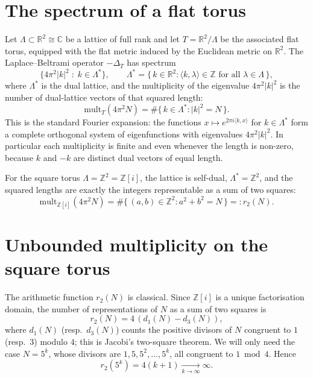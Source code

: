 \documentclass[11pt]{article}
\theoremstyle{definition}
\theoremstyle{remark}
\newcommand{\R}{\mathbb{R}}
\newcommand{\Z}{\mathbb{Z}}
\newcommand{\C}{\mathbb{C}}
\newcommand{\Lam}{\Lambda}
\newcommand{\rtwo}{r_2}
\begin{document}
\section{The spectrum of a flat torus}
\label{sec:spectral}

Let $\Lam\subset\R^2\cong\C$ be a lattice of full rank and let
$T=\R^2/\Lam$ be the associated flat torus, equipped with the flat metric
induced by the Euclidean metric on $\R^2$.  The Laplace--Beltrami operator
$-\Delta_T$ has spectrum
\begin{equation}
\label{eq:spectrum}
\{4\pi^2|k|^2 \;:\; k\in\Lam^{*}\},
\qquad
\Lam^{*}=\{\,k\in\R^2 : \langle k,\lambda\rangle\in\Z
\text{ for all }\lambda\in\Lam\,\},
\end{equation}
where $\Lam^{*}$ is the dual lattice, and the multiplicity of the eigenvalue
$4\pi^2|k|^2$ is the number of dual-lattice vectors of that squared length:
\begin{equation}
\label{eq:mult}
\mathrm{mult}_T(4\pi^2 N)=\#\{\,k\in\Lam^{*} : |k|^2=N\,\}.
\end{equation}
This is the standard Fourier expansion: the functions
$x\mapsto e^{2\pi i\langle k,x\rangle}$ for $k\in\Lam^{*}$ form a complete
orthogonal system of eigenfunctions with eigenvalues $4\pi^2|k|^2$.  In
particular each multiplicity is finite and even whenever the length is
non-zero, because $k$ and $-k$ are distinct dual vectors of equal length.

For the square torus $\Lam=\Z^2=\Z[i]$, the lattice is self-dual,
$\Lam^{*}=\Z^2$, and the squared lengths are exactly the integers representable
as a sum of two squares:
\begin{equation}
\label{eq:square-mult}
\mathrm{mult}_{\Z[i]}(4\pi^2 N)
=\#\{\,(a,b)\in\Z^2 : a^2+b^2=N\,\}
=:\rtwo(N).
\end{equation}

\section{Unbounded multiplicity on the square torus}
\label{sec:r2}

The arithmetic function $\rtwo(N)$ is classical.  Since $\Z[i]$ is a unique
factorisation domain, the number of representations of $N$ as a sum of two
squares is
\begin{equation}
\label{eq:r2-formula}
\rtwo(N)=4\,(d_1(N)-d_3(N)),
\end{equation}
where $d_1(N)$ (resp.\ $d_3(N)$) counts the positive divisors of $N$ congruent
to $1$ (resp.\ $3$) modulo $4$; this is Jacobi's two-square theorem.  We will
only need the case $N=5^k$, whose divisors are $1,5,5^2,\dots,5^k$, all
congruent to $1 \bmod 4$.  Hence
\begin{equation}
\label{eq:r2-5k}
\rtwo(5^k)=4(k+1) \xrightarrow[k\to\infty]{} \infty .
\end{equation}
\end{document}
